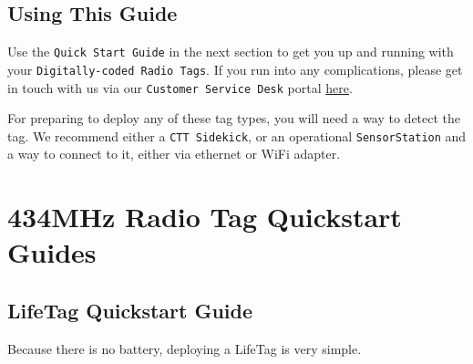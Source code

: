 \documentclass[
]{article}
\begin{document}
\hypertarget{using-this-guide}{%
\subsection{Using This Guide}\label{using-this-guide}}

Use the \texttt{Quick\ Start\ Guide} in the next section to get you up
and running with your \texttt{Digitally-coded\ Radio\ Tags}. If you run
into any complications, please get in touch with us via our
\texttt{Customer\ Service\ Desk} portal
\href{https://celltracktech.com/pages/customer-service-desk-csd}{here}.

For preparing to deploy any of these tag types, you will need a way to
detect the tag. We recommend either a \texttt{CTT\ Sidekick}, or an
operational \texttt{SensorStation} and a way to connect to it, either
via ethernet or WiFi adapter.

\hypertarget{mhz-radio-tag-quickstart-guides}{%
\section{434MHz Radio Tag Quickstart
Guides}\label{mhz-radio-tag-quickstart-guides}}

\hypertarget{lifetag-quickstart-guide}{%
\subsection{LifeTag Quickstart Guide}\label{lifetag-quickstart-guide}}

Because there is no battery, deploying a LifeTag is very simple.
\end{document}
